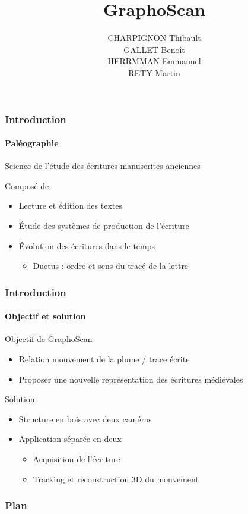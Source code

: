 \documentclass[12pt]{beamer}
\author{CHARPIGNON Thibault \\ GALLET Benoît \\ HERRMMAN Emmanuel \\ RETY Martin \\}
\title{GraphoScan}
\institute{ Université d'Orléans \\ \medskip \textit{Encadré par : EXBRAYAT Matthieu} }
\begin{document}
\begin{frame}
\titlepage
\end{frame}


\begin{frame}
\frametitle{Introduction}
\framesubtitle{Paléographie}
\begin{definition}
Science de l'étude des écritures manuscrites anciennes
\end{definition}
\begin{block}{Composé de}
\begin{itemize}
\item Lecture et édition des textes
\item Étude des systèmes de production de l'écriture
\item Évolution des écritures dans le temps
	\begin{itemize}
	\item Ductus : ordre et sens du tracé de la lettre
	\end{itemize}
\end{itemize}
\end{block}
\end{frame}

\begin{frame}
\frametitle{Introduction}
\framesubtitle{Objectif et solution}
\begin{block}{Objectif de GraphoScan}
\begin{itemize}
\item Relation mouvement de la plume / trace écrite
\item Proposer une nouvelle représentation des écritures médiévales
\end{itemize}
\end{block}

\begin{block}{Solution}
\begin{itemize}
\item Structure en bois avec deux caméras
\item Application séparée en deux
	\begin{itemize}
	\item Acquisition de l'écriture
	\item Tracking et reconstruction 3D du mouvement
	\end{itemize}
\end{itemize}
\end{block}
\end{frame}


\begin{frame}
\frametitle{Plan}
\tableofcontents
\end{frame}
\end{document}
